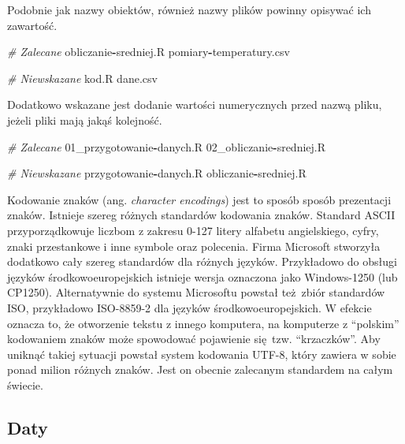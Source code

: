 \documentclass[paper=6in:9in,pagesize=pdftex,headinclude=on,footinclude=on,10pt]{scrbook}
\newenvironment{Shaded}{\begin{snugshade}}{\end{snugshade}}
\newcommand{\CommentTok}[1]{\textcolor[rgb]{0.56,0.35,0.01}{\textit{#1}}}
\newcommand{\DecValTok}[1]{\textcolor[rgb]{0.00,0.00,0.81}{#1}}
\newcommand{\NormalTok}[1]{#1}
\newcommand{\OperatorTok}[1]{\textcolor[rgb]{0.81,0.36,0.00}{\textbf{#1}}}
\let\BeginKnitrBlock\begin \let\EndKnitrBlock\end
\begin{document}
Podobnie jak nazwy obiektów, również nazwy plików powinny opisywać ich zawartość.

\begin{Shaded}
\begin{Highlighting}[]
\CommentTok{# Zalecane}
\NormalTok{obliczanie}\OperatorTok{-}\NormalTok{sredniej.R}
\NormalTok{pomiary}\OperatorTok{-}\NormalTok{temperatury.csv}

\CommentTok{# Niewskazane}
\NormalTok{kod.R}
\NormalTok{dane.csv}
\end{Highlighting}
\end{Shaded}

Dodatkowo wskazane jest dodanie wartości numerycznych przed nazwą pliku, jeżeli pliki mają jakąś kolejność.

\begin{Shaded}
\begin{Highlighting}[]
\CommentTok{# Zalecane}
\DecValTok{01}\NormalTok{_przygotowanie}\OperatorTok{-}\NormalTok{danych.R}
\DecValTok{02}\NormalTok{_obliczanie}\OperatorTok{-}\NormalTok{sredniej.R}

\CommentTok{# Niewskazane}
\NormalTok{przygotowanie}\OperatorTok{-}\NormalTok{danych.R}
\NormalTok{obliczanie}\OperatorTok{-}\NormalTok{sredniej.R}
\end{Highlighting}
\end{Shaded}

\BeginKnitrBlock{rmdinfo}
Kodowanie znaków (ang. \emph{character encodings}) jest to sposób sposób prezentacji znaków.
Istnieje szereg różnych standardów kodowania znaków.
Standard ASCII przyporządkowuje liczbom z zakresu 0-127 litery alfabetu angielskiego, cyfry, znaki przestankowe i inne symbole oraz polecenia.
Firma Microsoft stworzyła dodatkowo cały szereg standardów dla różnych języków.
Przykładowo do obsługi języków środkowoeuropejskich istnieje wersja oznaczona jako Windows-1250 (lub CP1250).
Alternatywnie do systemu Microsoftu powstał też~zbiór standardów ISO, przykładowo ISO-8859-2 dla języków środkowoeuropejskich.
W efekcie oznacza to, że otworzenie tekstu z innego komputera, na komputerze z ``polskim'' kodowaniem znaków może spowodować pojawienie się~tzw. ``krzaczków''.
Aby uniknąć takiej sytuacji powstał system kodowania UTF-8, który zawiera w sobie ponad milion różnych znaków.
Jest on obecnie zalecanym standardem na całym świecie.
\EndKnitrBlock{rmdinfo}

\hypertarget{daty}{%
\subsection{Daty}\label{daty}}
\end{document}

